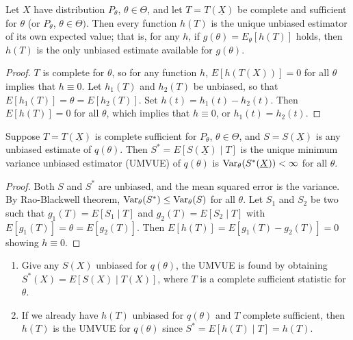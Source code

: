 \begin{theorem}
    Let $X$ have distribution $P_{\theta}$, $\theta \in \Theta$, and let $T = T(\underline{X})$ be complete and sufficient for $\theta$ (or $P_{\theta}$, $\theta \in \Theta)$. Then every function $h(T)$ is the unique unbiased estimator of its own expected value; that is, for any $h$, if $g(\theta) = E_{\theta}[h(T)]$ holds, then $h(T)$ is the only unbiased estimate available for $g(\theta)$.
\end{theorem}

\begin{proof}
    $T$ is complete for $\theta$, so for any function $h$, $E[h(T(X))] = 0$ for all $\theta$ implies that $h \equiv 0$. Let $h_{1}(T)$ and $h_{2}(T)$ be unbiased, so that $E[h_{1}(T)] = \theta = E[h_{2}(T)]$. Set $h(t) = h_{1}(t) - h_{2}(t)$. Then $E[h(T)] = 0$ for all $\theta$, which implies that $h \equiv 0$, or $h_{1}(t) = h_{2}(t)$.
\end{proof}

\begin{theorem}
    Suppose $T = T(\underline{X})$ is complete sufficient for $P_{\theta}$, $\theta \in \Theta$, and $S = S(\underline{X})$ is any unbiased estimate of $q(\theta)$. Then $S^{\ast} = E[S(\underline{X}) \mid T]$ is the unique minimum variance unbiased estimator (UMVUE) of $q(\theta)$ is $\operatorname{Var}_{\theta}(S^{\ast}(\underline{X})) < \infty$ for all $\theta$.
\end{theorem}

\begin{proof}
    Both $S$ and $S^{\ast}$ are unbiased, and the mean squared error is the variance. By Rao-Blackwell theorem, $\operatorname{Var}_{\theta}(S^{\ast}) \leq \operatorname{Var}_{\theta}(S)$ for all $\theta$. Let $S_{1}$ and $S_{2}$ be two such that $g_{1}(T) = E[S_{1} \mid T]$ and $g_{2}(T) = E[S_{2} \mid T]$ with $E[g_{1}(T)] = \theta = E[g_{2}(T)]$. Then $E[h(T)] = E[g_{1}(T)-g_{2}(T)] = 0$ showing $h \equiv 0$.
\end{proof}

\begin{remark}
    \begin{enumerate}
        \item Give any $S(X)$ unbiased for $q(\theta)$, the UMVUE is found by obtaining $S^{\ast}(X) = E[S(X) \mid T(X)]$, where $T$ is a complete sufficient statistic for $\theta$.
        \item If we already have $h(T)$ unbiased for $q(\theta)$ and $T$ complete sufficient, then $h(T)$ is the UMVUE for $q(\theta)$ since $S^{\ast} = E[h(T) \mid T] = h(T)$.
    \end{enumerate}
\end{remark}

